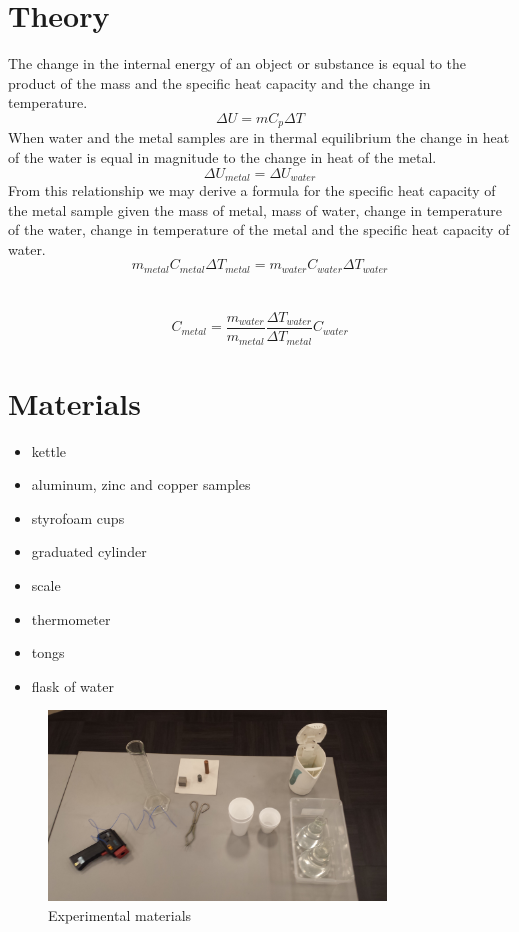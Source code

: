 \documentclass{article}
\begin{document}
\section{Theory}
The change in the internal energy of an object or substance is equal to the product of the mass and the specific heat capacity and the change in temperature.
$$\Delta U=mC_p\Delta T$$
When water and the metal samples are in thermal equilibrium the change in heat of the water is equal in magnitude to the change in heat of the metal.
$$\Delta U_{metal}=\Delta U_{water}$$
From this relationship we may derive a formula for the specific heat capacity of the metal sample given the mass of metal, mass of water, change in temperature of the water, change in temperature of the metal and the specific heat capacity of water.
$$m_{metal}C_{metal}\Delta T_{metal}=m_{water}C_{water}\Delta T_{water}$$\\
\\
$$\boxed{C_{metal}=\frac{m_{water}}{m_{metal}}  \frac{\Delta T_{water}}{\Delta T_{metal}}    C_{water}}$$

\newpage

\section{Materials}
\begin{itemize}
\item kettle 
\item aluminum, zinc and copper samples
\item styrofoam cups
\item graduated cylinder
\item scale
\item thermometer
\item tongs
\item flask of water
\end{itemize}

\begin{figure}[h]
\begin{center}
\includegraphics[width=0.8\textwidth]{pic} %
\caption{Experimental materials}
\end{center}
\end{figure}
\end{document}
